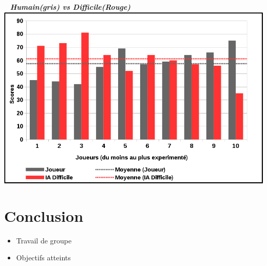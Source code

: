 \documentclass{beamer}
\begin{document}
\begin{frame}{}
\begin{center}
{
 \hspace*{2cm}~\tiny
 \textbf{\textit{Humain(gris) vs Difficile(Rouge)}}
 \newline
 \includegraphics[scale=0.40]{IA12}
}
\end{center}
\end{frame}

\section{Conclusion}

\begin{frame}
  \begin{itemize}
   \item Travail de groupe
   \item Objectifs atteints
  \end{itemize}
\end{frame}
\end{document}
